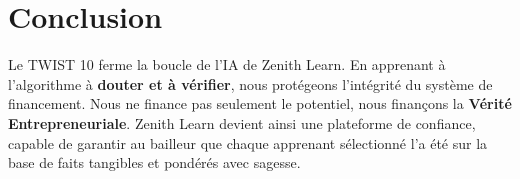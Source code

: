 \documentclass[11pt,a4paper]{article}
\begin{document}
\section{Conclusion}
Le TWIST 10 ferme la boucle de l'IA de Zenith Learn. En apprenant à l'algorithme à \textbf{douter et à vérifier}, nous protégeons l'intégrité du système de financement. Nous ne finance pas seulement le potentiel, nous finançons la \textbf{Vérité Entrepreneuriale}. Zenith Learn devient ainsi une plateforme de confiance, capable de garantir au bailleur que chaque apprenant sélectionné l'a été sur la base de faits tangibles et pondérés avec sagesse.
\end{document}
